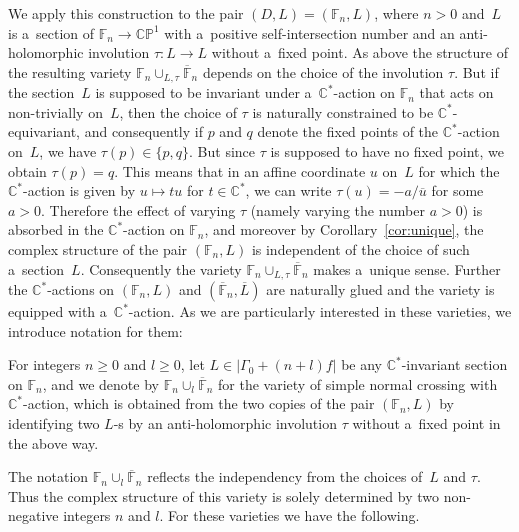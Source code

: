 \documentclass[11pt]{article}
\numberwithin{equation}{section}
\begin{document}
We apply this construction to the pair $(D,L) = (\mathbb{F}_n,L)$, where $n > 0$ and~$L$ is a~section of
$\mathbb{F}_n\to \mathbb{CP}^1$ with a~positive self-intersection number and an anti-holomorphic involution $\tau:L\to L$ without a~f\/ixed point.
As above the structure of the resulting variety $\mathbb{F}_n\cup_{L,\tau}\overline{\mathbb{F}}_n$ depends on the choice
of the involution $\tau$.
But if the section~$L$ is supposed to be invariant under a~$\mathbb{C}^*$-action on $\mathbb{F}_n$ that acts on
non-trivially on~$L$, then the choice of $\tau$ is naturally constrained to be $\mathbb{C}^*$-equivariant, and
consequently if $p$ and $q$ denote the f\/ixed points of the $\mathbb{C}^*$-action on~$L$, we have $\tau(p)\in\{p,q\}$.
But since $\tau$ is supposed to have no f\/ixed point, we obtain $\tau(p) = q$.
This means that in an af\/f\/ine coordinate $u$ on~$L$ for which the $\mathbb{C}^*$-action is given by $u\mapsto tu$ for
$t\in\mathbb{C}^*$, we can write $\tau(u) = -a/\overline u$ for some $a>0$.
Therefore the ef\/fect of varying $\tau$ (namely varying the number $a>0$) is absorbed in the $\mathbb{C}^*$-action on
$\mathbb{F}_n$, and moreover by Corollary~\ref{cor:unique}, the complex structure of the pair $(\mathbb{F}_n,L)$ is
independent of the choice of such a~section~$L$.
Consequently the variety $\mathbb{F}_n\cup_{L,\tau}\overline{\mathbb{F}}_n$ makes a~unique sense.
Further the $\mathbb{C}^*$-actions on $(\mathbb{F}_n,L)$ and $(\overline{\mathbb{F}}_n,\overline L)$ are naturally glued
and the variety is equipped with a~$\mathbb{C}^*$-action.
As we are particularly interested in these varieties, we introduce notation for them:

\begin{Definition}
\label{def:scn}
For integers $n \ge 0$ and $l\ge 0$, let $L\in |\Gamma_0 + (n+l)f|$ be any $\mathbb{C}^*$-invariant section on
$\mathbb{F}_n$, and we denote by $\mathbb{F}_n\cup_l\overline{\mathbb{F}}_n$ for the variety of simple normal crossing
with $\mathbb{C}^*$-action, which is obtained from the two copies of the pair $(\mathbb{F}_n,L)$ by identifying two
$L$-s by an anti-holomorphic involution $\tau$ without a~f\/ixed point in the above way.
\end{Definition}

The notation $\mathbb{F}_n\cup_l\overline{\mathbb{F}}_n$ ref\/lects the independency from the choices of~$L$ and $\tau$.
Thus the complex structure of this variety is solely determined by two non-negative integers $n$ and $l$.
For these varieties we have the following.
\end{document}
